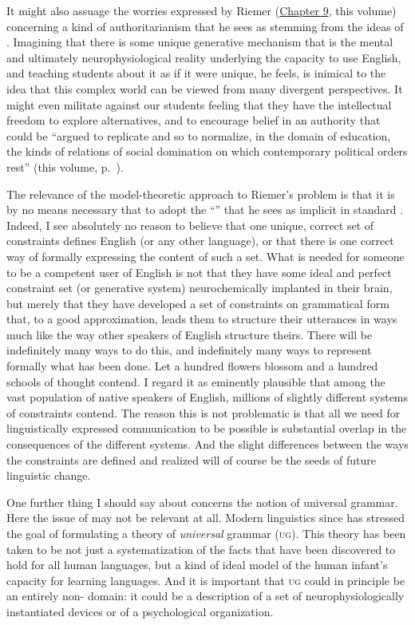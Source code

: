 \documentclass[output=paper]{langscibook}
\begin{document}
It might also assuage the worries expressed by Riemer (\hyperref[chap:riemer]{Chapter 9}, this volume) concerning a kind of authoritarianism that he sees as stemming from the ideas of . Imagining that there is some unique generative mechanism that is the mental and ultimately neurophysiological reality underlying the capacity to use English, and teaching students about it as if it were unique, he feels, is inimical to the idea that this complex world can be viewed from many divergent perspectives. It might even militate against our students feeling that they have the intellectual freedom to explore alternatives, and to encourage belief in an authority that could be ``argued to replicate and so to normalize, in the domain of education, the kinds of relations of social domination on which contemporary political orders rest'' (this volume, p.~\pageref{q:riemer:domination}).

The relevance of the model-theoretic approach to Riemer's problem is that it is by no means necessary that to adopt the ``'' that he sees as implicit in standard . Indeed, I see absolutely no reason to believe that one unique, correct set of constraints defines English (or any other language), or that there is one correct way of formally expressing the content of such a set. What is needed for someone to be a competent user of English is not that they have some ideal and perfect constraint set (or generative system) neurochemically implanted in their brain, but merely that they have developed a set of constraints on grammatical form that, to a good approximation, leads them to structure their utterances in ways much like the way other speakers of English structure theirs. There will be indefinitely many ways to do this, and indefinitely many ways to represent formally what has been done. Let a hundred flowers blossom and a hundred schools of thought contend. I regard it as eminently plausible that among the vast population of native speakers of English, millions of slightly different systems of constraints contend. The reason this is not problematic is that all we need for linguistically expressed communication to be possible is substantial overlap in the consequences of the different systems. And the slight differences between the ways the constraints are defined and realized will of course be the seeds of future linguistic change.

One further thing I should say about  concerns the notion of universal grammar. Here the issue of  may not be relevant at all. Modern linguistics since \citet{Chomsky65} has stressed the goal of formulating a theory of \emph{universal} grammar (\textsc{ug}).  This theory has been taken to be not just a systematization of the facts that have been discovered to hold for all human languages, but a kind of ideal model of the human infant's capacity for learning languages.  And it is important that \textsc{ug} could in principle be an entirely non- domain: it could be a description of a set of neurophysiologically instantiated devices or of a psychological organization.
\end{document}
